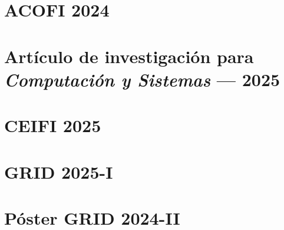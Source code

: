 \appendix


\newpage




\newpage



\newpage



\newpage


\FloatBarrier\section{ACOFI 2024}


\FloatBarrier\section{Artículo de investigación para \textbf{\textit{Computación y Sistemas}} --- 2025}


%
%
\FloatBarrier\section{CEIFI 2025}

%
\FloatBarrier\section{GRID 2025-I }

%
\FloatBarrier\section{Póster GRID 2024-II}

